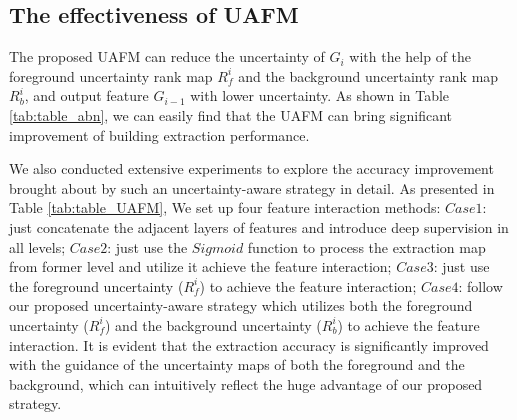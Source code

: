 \documentclass[lettersize,journal]{IEEEtran}
\begin{document}
\subsection{The effectiveness of UAFM}

The proposed UAFM can reduce the uncertainty of $G_{i}$ with the help of
the foreground uncertainty rank map $R_{f}^{i}$ and the background uncertainty rank map $R_{b}^{i}$, and output feature $G_{i-1}$ with lower uncertainty. As shown in Table \ref{tab:table_abn}, we can easily find that the UAFM can bring significant improvement of building extraction performance.
\par




We also conducted extensive experiments to explore the accuracy improvement brought about by such an uncertainty-aware strategy in detail. As presented in Table \ref{tab:table_UAFM}, We set up four feature interaction methods: \textbf{$Case 1$}: just concatenate the adjacent layers of features and introduce deep supervision in all levels; \textbf{$Case 2$}: just use the $Sigmoid$ function to process the extraction map from former level and utilize it achieve the feature interaction; \textbf{$Case 3$}: just use the foreground uncertainty ($R_{f}^{i}$) to achieve the feature interaction; \textbf{$Case 4$}: follow our proposed uncertainty-aware strategy which utilizes both the foreground uncertainty ($R_{f}^{i}$) and the background uncertainty ($R_{b}^{i}$) to achieve the feature interaction. 
It is evident that the extraction accuracy is significantly improved with the guidance of the uncertainty maps of both the foreground and the background, which can intuitively reflect the huge advantage of our proposed strategy.
\end{document}
